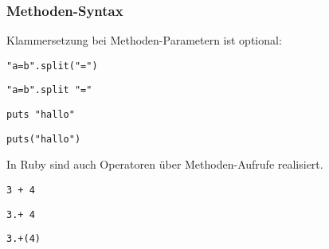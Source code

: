 \documentclass{beamer}
\begin{document}
\begin{frame}[fragile]
  \frametitle{Methoden-Syntax}
  Klammersetzung bei Methoden-Parametern ist optional:
  
  \verb|"a=b".split("=")| \pause
  
  \verb|"a=b".split "="| \pause
  
  \smallskip
  \verb|puts "hallo"| \pause
  
  \verb|puts("hallo")| \pause
  
  
  \medskip 
  In Ruby sind auch Operatoren über Methoden-Aufrufe realisiert.
  \pause
  
  \medskip
  \begin{center}

  \verb|3 + 4 | \pause
  
  \verb|3.+ 4 | \pause
  
  \verb|3.+(4)| \pause
   
  \end{center}
  
  
  
  
\begin{comment}  
 
  Methoden-Definition
  \begin{lstlisting}
  def dreifach(wert)
    wert * 3
  end
  \end{lstlisting}
  \pause
  Methoden-Aufruf
  \begin{lstlisting}
  puts dreifach(2) 
  \end{lstlisting}
  $\longrightarrow$ 6
  \begin{lstlisting}
  def dreifach wert 
    wert * 3
  end
  \end{lstlisting}
  \pause
  \begin{lstlisting}
  puts dreifach(2) 
  puts dreifach 2 
  \end{lstlisting}
  \pause
  \begin{lstlisting}
  puts(dreifach(2)) 
  \end{lstlisting}
\end{comment}
\end{frame}
\end{document}
